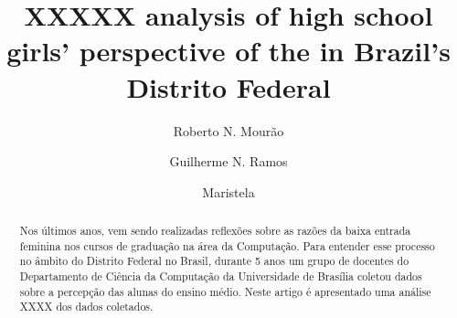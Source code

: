 \documentclass{llncs}
\begin{document}
%
\title{XXXXX analysis of high school girls' perspective of the in Brazil's Distrito Federal}%
%
\author{Roberto N. Mourão%
\and Guilherme N. Ramos%
\and Maristela}%
%
%

\maketitle%

\begin{abstract}%
Nos últimos anos, vem sendo realizadas reflexões sobre as razões da baixa entrada feminina nos cursos de graduação na área da Computação. Para entender esse processo no âmbito do Distrito Federal no Brasil, durante 5 anos um grupo de docentes do Departamento de Ciência da Computação da Universidade de Brasília coletou dados sobre a percepção das alunas do ensino médio. Neste artigo é apresentado uma análise XXXX dos dados coletados.%

%
\end{abstract}%

%
%
%
%
%

%
%
\end{document}
